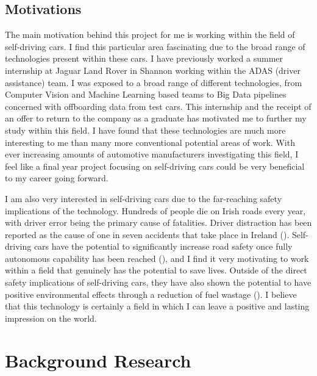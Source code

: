\documentclass[12pt]{report}
\begin{document}
\newpage
\section{Motivations}
\begin{flushleft}
The main motivation behind this project for me is working within the field of self-driving cars. I find this particular area fascinating due to the broad range of technologies present within these cars. I have previously worked a summer internship at Jaguar Land Rover in Shannon working within the ADAS (driver assistance) team. I was exposed to a broad range of different technologies, from Computer Vision and Machine Learning based teams to Big Data pipelines concerned with offboarding data from test cars. This internship and the receipt of an offer to return to the company as a graduate has motivated me to further my study within this field. I have found that these technologies are much more interesting to me than many more conventional potential areas of work. With ever increasing amounts of automotive manufacturers investigating this field, I feel like a final year project focusing on self-driving cars could be very beneficial to my career going forward.

I am also very interested in self-driving cars due to the far-reaching safety implications of the technology. Hundreds of people die on Irish roads every year, with driver error being the primary cause of fatalities. Driver distraction has been reported as the cause of one in seven accidents that take place in Ireland (\cite{rsadistraction}). Self-driving cars have the potential to significantly increase road safety once fully autonomous capability has been reached (\cite{milakis2017policy}), and I find it very motivating to work within a field that genuinely has the potential to save lives. Outside of the direct safety implications of self-driving cars, they have also shown the potential to have positive environmental effects through a reduction of fuel wastage (\cite{greenblatt2015autonomous}). I believe that this technology is certainly a field in which I can leave a positive and lasting impression on the world.
\end{flushleft}

\newpage
\chapter{Background Research}
\end{document}
